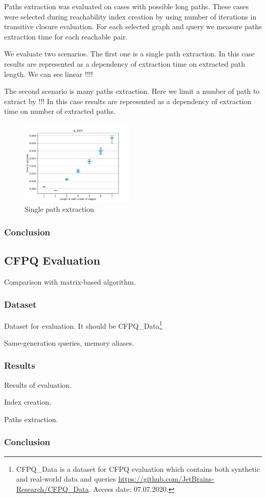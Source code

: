 Paths extraction was evaluated on cases with possible long paths.
These cases were selected during reachability index creation by using number of iterations in transitive closure evaluation.
For each selected graph and query we measure paths extraction time for each reachable pair. 

We evaluate two scenarios.
The first one is a single path extraction.
In this case results are represented as a dependency of extraction time on extracted path length.
We can see linear !!!!

The second scenario is many paths extraction.
Here we limit a number of path to extract by !!! 
In this case results are represented as a dependency of extraction time on number of extracted paths.


\begin{figure}
   \includegraphics[width=0.48\textwidth]{data/res_graphics/q_14_5.pdf}
   \caption{Single path extraction}
\end{figure}



\subsubsection{Conclusion}

\subsection{CFPQ Evaluation}

Comparison with matrix-based algorithm.

\subsubsection{Dataset}

Dataset for evaluation. 
It should be CFPQ\_Data\footnote{CFPQ\_Data is a dataset for CFPQ evaluation which contains both synthetic and real-world data and queries \url{https://github.com/JetBrains-Research/CFPQ\_Data}. Access date: 07.07.2020.}

Same-generation queries, memory aliases.

\subsubsection{Results}

Results of evaluation.

Index creation.

Paths extraction.

\subsubsection{Conclusion}
